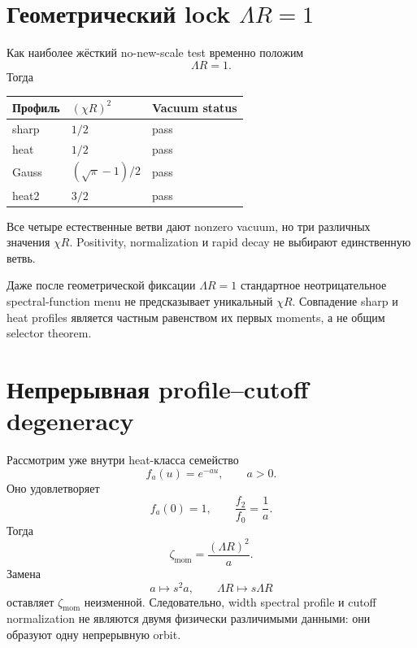 \section{Геометрический lock \(\Lambda R=1\)}

Как наиболее жёсткий no-new-scale test временно положим
\begin{equation}
 \Lambda R=1.
\end{equation}
Тогда
\begin{center}
\begin{tabular}{lll}
\toprule
Профиль & \((\chi R)^2\) & Vacuum status \\
\midrule
sharp & \(1/2\) & pass \\
heat & \(1/2\) & pass \\
Gauss & \((\sqrt\pi-1)/2\) & pass \\
heat2 & \(3/2\) & pass \\
\bottomrule
\end{tabular}
\end{center}
Все четыре естественные ветви дают nonzero vacuum, но три различных
значения \(\chi R\). Positivity, normalization и rapid decay не выбирают
единственную ветвь.

\begin{proposition}
Даже после геометрической фиксации \(\Lambda R=1\) стандартное
неотрицательное spectral-function menu не предсказывает уникальный
\(\chi R\). Совпадение sharp и heat profiles является частным равенством
их первых moments, а не общим selector theorem.
\end{proposition}

\section{Непрерывная profile--cutoff degeneracy}

Рассмотрим уже внутри heat-класса семейство
\begin{equation}
 f_a(u)=e^{-au},
 \qquad a>0.
\end{equation}
Оно удовлетворяет
\begin{equation}
 f_a(0)=1,
 \qquad
 \frac{f_2}{f_0}=\frac1a.
\end{equation}
Тогда
\begin{equation}
 \zeta_{\mathrm{mom}}
 =\frac{(\Lambda R)^2}{a}.
\end{equation}
Замена
\begin{equation}
 a\longmapsto s^2a,
 \qquad
 \Lambda R\longmapsto s\Lambda R
\end{equation}
оставляет \(\zeta_{\mathrm{mom}}\) неизменной. Следовательно, width
spectral profile и cutoff normalization не являются двумя физически
различимыми данными: они образуют одну непрерывную orbit.

